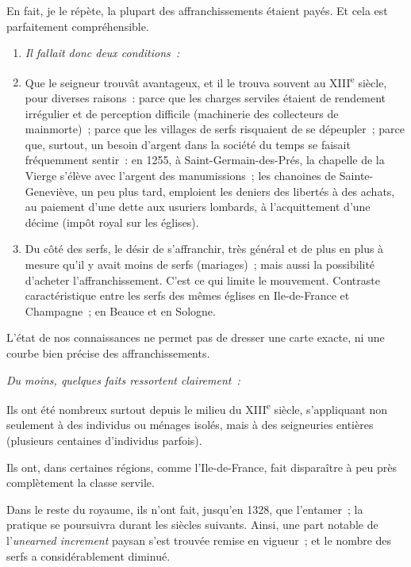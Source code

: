 \documentclass[french,twoside]{book} %
\newlength{\listmod}
\newcommand{\listhead}[1]{\hspace{-1\listmod}\emph{#1}}
\begin{document}
\noindent En fait, je le répète, la plupart des affranchissements étaient payés. Et cela est parfaitement compréhensible.\par

\begin{enumerate}[itemsep=0pt,]
\item[]\listhead{Il fallait donc deux conditions :}
\item Que le seigneur trouvât avantageux, et il le trouva souvent au XIII\textsuperscript{e} siècle, pour diverses raisons : parce que les charges serviles étaient de rendement irrégulier et de perception difficile (machinerie  
\label{p61} des collecteurs de mainmorte) ; parce que les villages de serfs risquaient de se dépeupler ; parce que, surtout, un besoin d’argent dans la société du temps se faisait fréquemment sentir : en 1255, à Saint-Germain-des-Prés, la chapelle de la Vierge s’élève avec l’argent des manumissions ; les chanoines de Sainte-Geneviève, un peu plus tard, emploient les deniers des libertés à des achats, au paiement d’une dette aux usuriers lombards, à l’acquittement d’une décime (impôt royal sur les églises).
\item Du côté des serfs, le désir de s’affranchir, très général et de plus en plus à mesure qu’il y avait moins de serfs (mariages) ; mais aussi la possibilité d’acheter l’affranchissement. C’est ce qui limite le mouvement. Contraste caractéristique entre les serfs des mêmes églises en Ile-de-France et Champagne ; en Beauce et en Sologne.
\end{enumerate}

\noindent L’état de nos connaissances ne permet pas de dresser une carte exacte, ni une courbe bien précise des affranchissements.\par

\begin{listalpha}[itemsep=0pt,]
\item[]\listhead{Du moins, quelques faits ressortent clairement :}
\item Ils ont été nombreux surtout depuis le milieu du XIII\textsuperscript{e} siècle, s’appliquant non seulement à des individus ou ménages isolés, mais à des seigneuries entières (plusieurs centaines d’individus parfois).
\item Ils ont, dans certaines régions, comme l’Ile-de-France, fait disparaître à peu près complètement la classe servile.
\item Dans le reste du royaume, ils n’ont fait, jusqu’en 1328, que l’entamer ; la pratique se poursuivra durant les siècles suivants. Ainsi, une part notable de l’{\itshape unearned increment} paysan s’est trouvée remise en vigueur ; et le nombre des serfs a considérablement diminué.
\end{listalpha}
\end{document}
